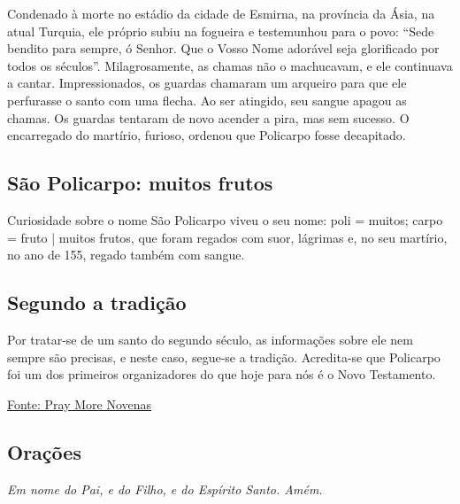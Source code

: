 \documentclass[18pt]{article}
\begin{document}
\begin{justify}
Condenado à morte no estádio da cidade de Esmirna, na província da Ásia, na atual Turquia, ele próprio subiu na fogueira e testemunhou para o povo: “Sede bendito para sempre, ó Senhor. Que o Vosso Nome adorável seja glorificado por todos os séculos”. Milagrosamente, as chamas não o machucavam, e ele continuava a cantar. Impressionados, os guardas chamaram um arqueiro para que ele perfurasse o santo com uma flecha. Ao ser atingido, seu sangue apagou as chamas. Os guardas tentaram de novo acender a pira, mas sem sucesso. O encarregado do martírio, furioso, ordenou que Policarpo fosse decapitado.

\begin{justify}
 \subsection{São Policarpo: muitos frutos}
\end{justify}

Curiosidade sobre o nome
São Policarpo viveu o seu nome: poli = muitos; carpo = fruto | muitos frutos, que foram regados com suor, lágrimas e, no seu martírio, no ano de 155, regado também com sangue.

\begin{justify}
 \subsection{Segundo a tradição}
\end{justify}

Por tratar-se de um santo do segundo século, as informações sobre ele nem sempre são precisas, e neste caso, segue-se a tradição. Acredita-se que Policarpo foi um dos primeiros organizadores do que hoje para nós é o Novo Testamento.


\vfill

\begin{center}
 \href{https://www.praymorenovenas.com/st-margaret-of-cortona-novena}{Fonte: Pray More Novenas}
\end{center}


\newpage
\begin{center}
 \section{Orações}\label{sec:Orações} %
\textit{Em nome do Pai, e do Filho, e do Espírito Santo. Amém.}
\end{center}


\end{justify}
\end{document}
